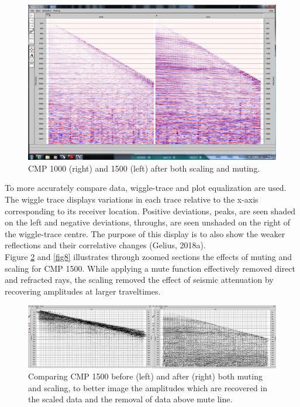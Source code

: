 \documentclass[10pt,a4paper]{article}
\begin{document}
\begin{figure}[H]
\includegraphics[width=\textwidth, trim={1.5cm 1.5cm 1cm 1.5cm},clip]{fig6.jpg}
\caption{CMP 1000 (right) and 1500 (left) after both scaling and muting.}
\label{fig6}
\end{figure}

\noindent To more accurately compare data, wiggle-trace and plot equalization are used. The wiggle trace displays variations in each trace relative to the x-axis corresponding to its receiver location. Positive deviations, peaks, are seen shaded on the left and negative deviations, throughs, are seen unshaded on the right of the wiggle-trace centre. The purpose of this display is to also show the weaker reflections and their correlative changes (Gelius, 2018a). 
\\
Figure \ref{fig7} and \ref{fig8} illustrates through zoomed sections the effects of muting and scaling for CMP 1500. While applying a mute function effectively removed direct and refracted rays, the scaling removed the effect of seismic attenuation by recovering amplitudes at larger traveltimes. 


\begin{figure}[H]
\includegraphics[width=\textwidth]{fig7ekte.jpg}
\caption{Comparing CMP 1500 before (left) and after (right) both muting and scaling, to better image the amplitudes which are recovered in the scaled data and the removal of data above mute line.}
\label{fig7}
\end{figure}
\end{document}
